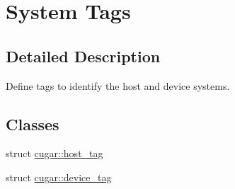 \hypertarget{group___system_tags}{}\section{System Tags}
\label{group___system_tags}


\subsection{Detailed Description}
\begin{DoxyParagraph}{}
Define tags to identify the host and device systems. 
\end{DoxyParagraph}
\subsection*{Classes}
\begin{DoxyCompactItemize}
\item 
struct \hyperlink{structcugar_1_1host__tag}{cugar\+::host\+\_\+tag}
\item 
struct \hyperlink{structcugar_1_1device__tag}{cugar\+::device\+\_\+tag}
\end{DoxyCompactItemize}
